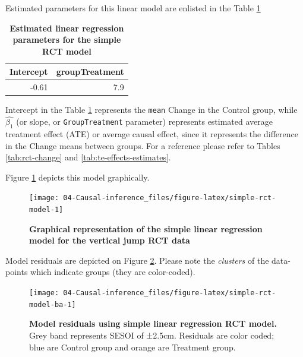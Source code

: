 \documentclass[
]{book}
\begin{document}
Estimated parameters for this linear model are enlisted in the Table \ref{tab:simple-rct-model-coef}



\begin{table}

\caption{\label{tab:simple-rct-model-coef}\textbf{Estimated linear regression parameters for the simple RCT model}}
\centering
\begin{tabular}[t]{rr}
\toprule
Intercept & groupTreatment\\
\midrule
-0.61 & 7.9\\
\bottomrule
\end{tabular}
\end{table}

Intercept in the Table \ref{tab:simple-rct-model-coef} represents the \texttt{mean} Change in the Control group, while \(\hat{\beta_1}\) (or slope, or \texttt{GroupTreatment} parameter) represents estimated average treatment effect (ATE) or average causal effect, since it represents the difference in the Change means between groups. For a reference please refer to Tables \ref{tab:rct-change} and \ref{tab:te-effects-estimates}.

Figure \ref{fig:simple-rct-model} depicts this model graphically.

\begin{figure}

{\centering \texttt{[image: 04-Causal-inference\_files/figure-latex/simple-rct-model-1]} 

}

\caption{\textbf{Graphical representation of the simple linear regression model for the vertical jump RCT data}}\label{fig:simple-rct-model}
\end{figure}



Model residuals are depicted on Figure \ref{fig:simple-rct-model-ba}. Please note the \emph{clusters} of the data-points which indicate groups (they are color-coded).

\begin{figure}

{\centering \texttt{[image: 04-Causal-inference\_files/figure-latex/simple-rct-model-ba-1]} 

}

\caption{\textbf{Model residuals using simple linear regression RCT model. }Grey band represents SESOI of ±2.5cm. Residuals are color coded; blue are Control group and orange are Treatment group.}\label{fig:simple-rct-model-ba}
\end{figure}
\end{document}
